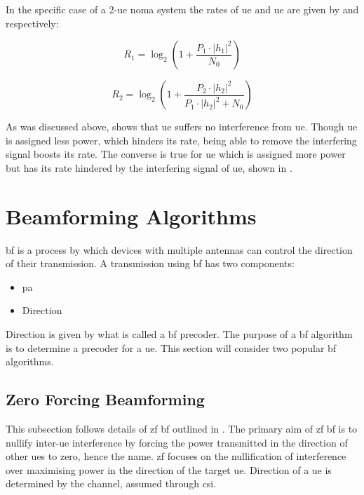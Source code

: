 \par
In the specific case of a 2-\ac{ue} \ac{noma} system the rates of \ac{ue} and \ac{ue} are given by  and  respectively:

\begin{equation}
	R_1 = \log_2 
	\left(
	1 +
	\frac{P_1 \cdot \left| h_1 \right| ^2}
	{N_0}
	\right)
	\label{eq:noma1}
\end{equation}

\begin{equation}
	R_2 = \log_2 
	\left(
	1 +
	\frac{P_2 \cdot \left| h_2 \right| ^2}
	{P_{1} \cdot \left| h_2 \right| ^2 + N_0}
	\right)
	\label{eq:noma2}
\end{equation}

\par
As was discussed above,  shows that \ac{ue} suffers no interference from \ac{ue}.
Though \ac{ue} is assigned less power, which hinders its rate, being able to remove the interfering signal boosts its rate.
The converse is true for \ac{ue} which is assigned more power but has its rate hindered by the interfering signal of \ac{ue}, shown in .

\section{Beamforming Algorithms}
\ac{bf} is a process by which devices with multiple antennas can control the direction of their transmission.
A transmission using \ac{bf} has two components:

\begin{itemize}
	\item \acl{pa}
	\item Direction
\end{itemize}

\par
Direction is given by what is called a \ac{bf} precoder.
The purpose of a \ac{bf} algorithm is to determine a precoder for a \ac{ue}.
This section will consider two popular \ac{bf} algorithms.

\subsection{Zero Forcing Beamforming}
This subsection follows details of \ac{zf} \ac{bf} outlined in \cite{zf,zf2}.
The primary aim of \ac{zf} \ac{bf} is to nullify inter-\ac{ue} interference by forcing the power transmitted in the direction of other \acp{ue} to zero, hence the name.
\ac{zf} focuses on the nullification of interference over maximising power in the direction of the target \ac{ue}.
Direction of a \ac{ue} is determined by the channel, assumed through \ac{csi}.

